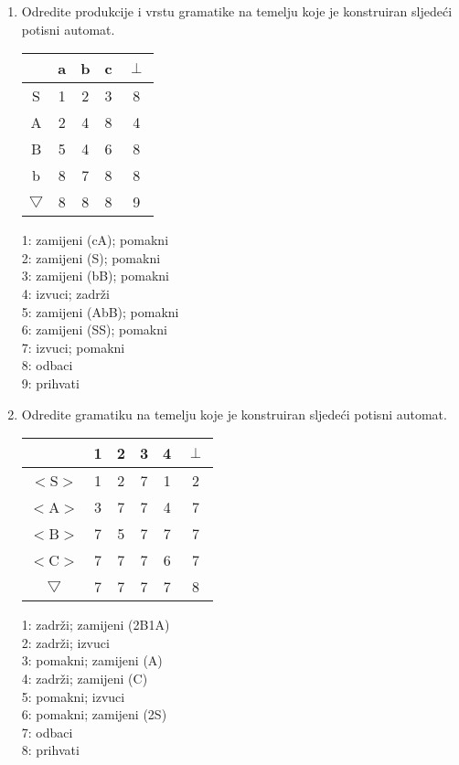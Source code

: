 \documentclass[times, 12pt, utf8]{book}
\begin{document}
\begin{enumerate}[resume]
\item
Odredite produkcije i vrstu gramatike na temelju koje je konstruiran sljedeći potisni automat. \cite[str.~85-99]{udzbenik} \cite{auditorne}

\begin{tabular}{| c | c | c | c | c | }
\hline
 & a & b & c & $\perp$ \\ \hline
S & 1 & 2 & 3 & 8 \\ \hline
A & 2 & 4 & 8 & 4 \\ \hline
B & 5 & 4 & 6 & 8 \\ \hline
b & 8 & 7 & 8 & 8 \\ \hline
$\bigtriangledown$ & 8 & 8 & 8 & 9 \\ \hline
\end{tabular}

1: zamijeni (cA);	pomakni \\
2: zamijeni (S);	pomakni \\
3: zamijeni (bB);	pomakni \\
4: izvuci;	zadrži \\
5: zamijeni (AbB);	pomakni \\
6: zamijeni (SS);	pomakni \\
7: izvuci;	pomakni \\
8: odbaci \\
9: prihvati \\

\item
Odredite gramatiku na temelju koje je konstruiran sljedeći potisni automat. \cite[str.~85-99]{udzbenik} \cite{auditorne}

\begin{tabular}{| c | c | c | c | c | c | } \hline
 & 1 & 2 & 3 & 4 & $\perp$ \\ \hline
$<$S$>$ & 1 & 2 & 7 & 1 & 2 \\ \hline
$<$A$>$ & 3 & 7 & 7 & 4 & 7 \\ \hline
$<$B$>$ & 7 & 5 & 7 & 7 & 7 \\ \hline
$<$C$>$ & 7 & 7 & 7 & 6 & 7 \\ \hline
$\bigtriangledown$ & 7 & 7 & 7 & 7 & 8 \\ \hline
\end{tabular}

1: zadrži; zamijeni (2B1A) \\
2: zadrži; izvuci \\
3: pomakni; zamijeni (A) \\
4: zadrži; zamijeni (C) \\
5: pomakni; izvuci \\
6: pomakni; zamijeni (2S) \\
7: odbaci \\
8: prihvati \\


\end{enumerate}
\end{document}
